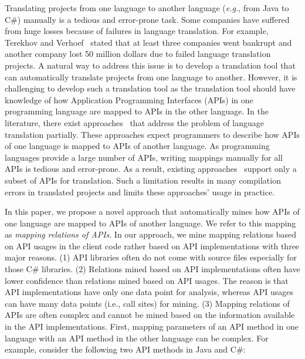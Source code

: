 Translating projects from one language to another language
(\emph{e.g.}, from Java to C\#) manually is a tedious and
error-prone task. Some companies have suffered from huge losses because
of failures in language translation. For example, Terekhov and
Verhoef~\cite{terekhov2000realities} stated that at least three
companies went bankrupt and another company lost 50 million dollars
due to failed language translation projects. A natural way to
address this issue is to develop a translation tool that can
automatically translate projects from one language to another.
However, it is challenging to develop such a translation tool as the
translation tool should have knowledge of how Application
Programming Interfaces (APIs) in one programming
language are mapped to APIs in the other language. In the literature, there exist
approaches~\cite{mossienko2003automated, yasumatsu1995spice,
hainaut2008migration} that address the problem of language
translation partially. These approaches expect programmers to
describe how APIs of one language is mapped to APIs of another
language.  As programming languages provide a large number of APIs,
writing mappings manually for all APIs is tedious and error-prone.
As a result, existing approaches~\cite{mossienko2003automated,yasumatsu1995spice,hainaut2008migration}
support only a subset of APIs for translation. Such a limitation
results in many compilation errors in translated projects and limits
these approaches' usage in practice.

In this paper, we propose a novel approach that automatically mines how APIs of
one language are mapped to APIs of another language. We refer to
this mapping as \emph{mapping relations of APIs}. In our approach,
we mine mapping relations based on API usages in the client
code rather based on API implementations with three major reasons.
(1) API libraries often do not come with source files especially for
those C\# libraries. (2) Relations mined based on API
implementations often have lower confidence than
relations mined based on API usages. The reason is that API
implementations have only one data point for analysis, whereas
API usages can have many data points (i.e., call sites) for mining. (3) Mapping
relations of APIs are often complex and cannot be mined based
on the information available in the API implementations. First,
mapping parameters of an API method in one language with an API
method in the other language can be complex. For example, consider
the following two API methods in Java and C\#:

